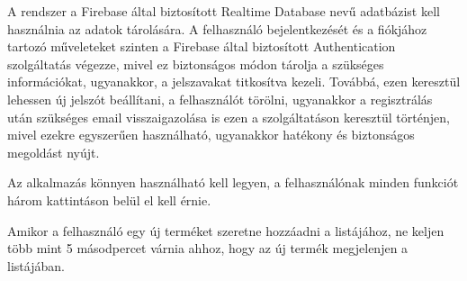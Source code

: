 A rendszer a Firebase által biztosított Realtime Database nevű adatbázist kell használnia az adatok tárolására. A felhasználó bejelentkezését és a fiókjához tartozó műveleteket szinten a Firebase által biztosított Authentication szolgáltatás végezze, mivel ez biztonságos módon tárolja a szükséges információkat, ugyanakkor, a jelszavakat titkosítva kezeli. Továbbá, ezen keresztül lehessen új jelszót beállítani, a felhasználót törölni, ugyanakkor a regisztrálás után szükséges email visszaigazolása is ezen a szolgáltatáson keresztül történjen, mivel ezekre egyszerűen használható, ugyanakkor hatékony és biztonságos megoldást nyújt.

Az alkalmazás könnyen használható kell legyen, a felhasználónak minden funkciót három kattintáson belül el kell érnie. 

Amikor a felhasználó egy új terméket szeretne hozzáadni a listájához, ne keljen több mint 5 másodpercet várnia ahhoz, hogy az új termék megjelenjen a listájában. 
